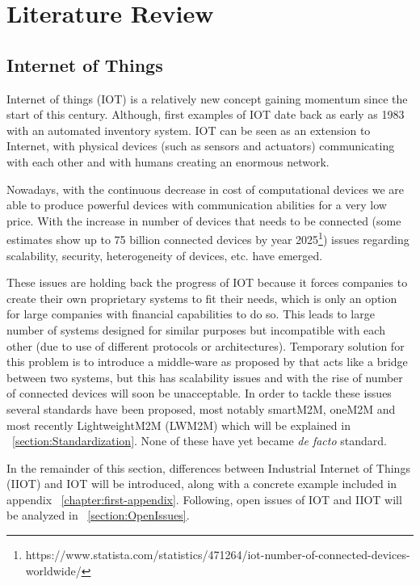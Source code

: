 \chapter{Literature Review}
\label{chapter:background} 


\section{Internet of Things}

Internet of things (IOT) is a relatively new concept gaining momentum since the start of this century. Although, first examples
of IOT date back as early as 1983 with an automated inventory system. IOT can be seen as an extension to Internet, with physical devices (such as sensors and actuators) communicating with each other and with humans creating an enormous network.

Nowadays, with the continuous decrease in cost of computational devices 
we are able to produce powerful devices with communication abilities for a very low price. With the increase in number 
of devices that needs to be connected (some estimates show up to 75 billion connected devices by year 2025\footnote{https://www.statista.com/statistics/471264/iot-number-of-connected-devices-worldwide/}) issues regarding scalability, security, heterogeneity of devices, etc. have emerged. 

These issues are holding back the progress of IOT because it forces companies to create their own proprietary systems to fit their needs, which is only an option for
large companies with financial capabilities to do so. This leads to large number of systems designed for similar purposes but incompatible with each other (due to use of different protocols or architectures). Temporary solution for this problem is to introduce a middle-ware as proposed by \cite{Bandyopadhyay2011} that acts like a bridge between two systems, but this has scalability issues and with the rise of number of connected devices will soon be unacceptable. In order to tackle these issues several standards have been proposed, most notably smartM2M, oneM2M and most recently LightweightM2M (LWM2M) which will be explained in ~\ref{section:Standardization}. None of these have yet became \emph{de facto} standard.

In the remainder of this section, differences between Industrial Internet of Things (IIOT) and IOT will be introduced, along with a concrete example included in appendix 
~\ref{chapter:first-appendix}. 
Following, open issues of IOT and IIOT will be analyzed in ~\ref{section:OpenIssues}. 



